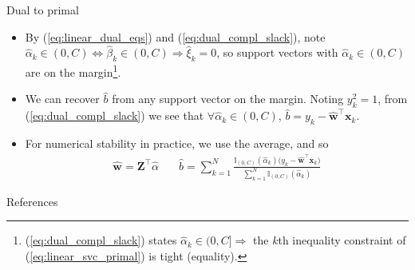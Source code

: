 \documentclass{beamer}
\numberwithin{equation}{section}
\newcommand{\aref}[1]{\alert{\ref{#1}}}
\begin{document}
\begin{frame}{Dual to primal}
    \begin{itemize}
        \item
        By (\aref{eq:linear_dual_eqs}) and (\aref{eq:dual_compl_slack}), note
        $ \hat{\alpha}_k \in (0, C) \Leftrightarrow
        \hat{\beta}_k \in (0, C) \Rightarrow \hat{\xi}_k = 0 $, so support
        vectors with $ \hat{\alpha}_k \in (0, C) $ are on the margin\footnote{
            (\aref{eq:dual_compl_slack}) states $ \hat{\alpha}_k \in (0, C]
            \Rightarrow $ the $ k $th inequality constraint of
            (\aref{eq:linear_svc_primal}) is tight (equality).
        }.

        \item
        We can recover $ \hat{b} $ from any support vector on the margin.
        Noting $ y_k^2 = 1 $, from (\aref{eq:dual_compl_slack}) we see that
        $ \forall\hat{\alpha}_k \in (0, C) $,
        $ \hat{b} = y_k - \hat{\mathbf{w}}^\top\mathbf{x}_k $.

        \item
        For numerical stability \cite{esl} in practice, we use the average,
        and so
        \begin{equation} \label{eq:linear_svc_primal_from_dual}
            \begin{array}{cc}
                \displaystyle\hat{\mathbf{w}} = \mathbf{Z}^\top\hat{\alpha}
                \quad &
                \displaystyle\hat{b} =
                \sum_{k = 1}^N\frac{
                    \mathbb{I}_{(0, C)}(\hat{\alpha}_k)\big(
                        y_k - \hat{\mathbf{w}}^\top\mathbf{x}_k
                    \big)
                }{\sum_{k = 1}^N\mathbb{I}_{(0, C)}(\hat{\alpha}_k)}
            \end{array}
        \end{equation}
    \end{itemize}
\end{frame}

\begin{frame}{References}
    
    
\end{frame}
\end{document}
